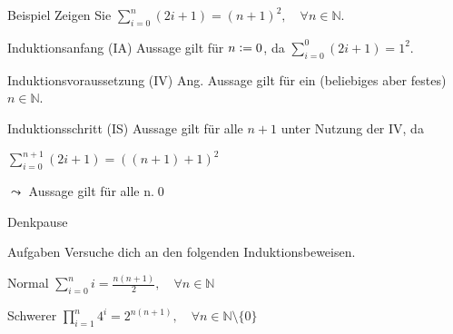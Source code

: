 \begin{frame}[fragile]{Beispiel}
Zeigen Sie $\displaystyle\sum_{i = 0}^{n} (2i+1) = (n+1)^2, \quad\forall n \in\mathbb{N}$.
\begin{alertblock}{Induktionsanfang (IA)}
    Aussage gilt für $n\vcentcolon=0$, da $\displaystyle\sum_{i = 0}^{0} (2i+1) = 1^2$.
\end{alertblock}
\begin{alertblock}{Induktionsvoraussetzung (IV)}
    Ang. Aussage gilt für ein (beliebiges aber festes) $n \in\mathbb{N}$.
\end{alertblock}
\begin{alertblock}{Induktionsschritt (IS)}
    Aussage gilt für alle $n+1$ unter Nutzung der IV, da\par
    $\displaystyle\sum_{i = 0}^{n+1} (2i+1) = ((n+1)+1)^2$
\end{alertblock}
\alert{$\leadsto$ Aussage gilt für alle n.}\qed
\end{frame}


{
\begin{frame}[fragile]{Denkpause}
    \begin{alertblock}{Aufgaben}
    Versuche dich an den folgenden Induktionsbeweisen.
    \end{alertblock}

    \begin{block}{Normal}
        $\displaystyle\sum_{i=0}^{n} i = \frac{n(n+1)}{2}, \quad \forall n \in \mathbb{N}$
    \end{block}
    \begin{block}{Schwerer}
        $\displaystyle\prod_{i=1}^{n} 4^i = 2^{n(n+1)}, \quad \forall n \in \mathbb{N}\setminus \{0\}$
    \end{block}
\end{frame}
}


